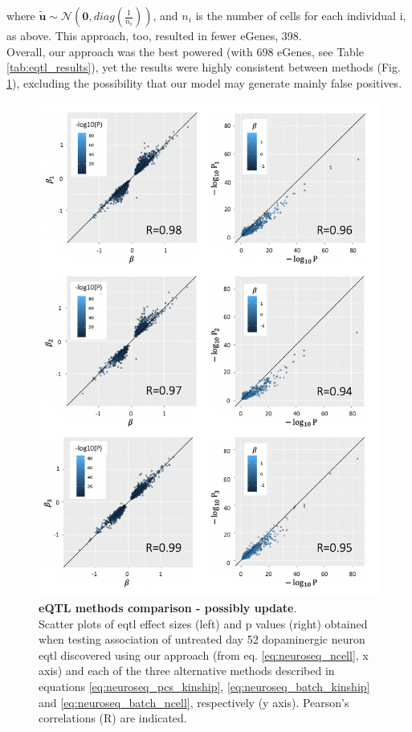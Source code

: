where $\tilde{\mathbf{u}} \sim \mathcal{N}(\mathbf{0}, diag(\frac{1}{n_i}))$, and $n_i$ is the number of cells for each individual i, as above.
This approach, too, resulted in fewer eGenes, 398.\\

Overall, our approach was the best powered (with 698 eGenes, see Table \ref{tab:eqtl_results}), yet the results were highly consistent between methods (Fig. \ref{fig:neuroseq_eqtl_methods_comp}), excluding the possibility that our model may generate mainly false positives.

\begin{figure}[htbp]
\centering
\includegraphics[width=13.5cm]{Chapter5/Fig/neuroseq_eqtl_methods_corr.png}
\caption[eQTL methods comparison]{\textbf{eQTL methods comparison - possibly update}.\\
Scatter plots of \gls{eqtl} effect sizes (left) and p values (right) obtained when testing association of untreated day 52 dopaminergic neuron \gls{eqtl} discovered using our approach (from eq. \eqref{eq:neuroseq_ncell}, x axis) and each of the three alternative methods described in equations \eqref{eq:neuroseq_pcs_kinship}, \eqref{eq:neuroseq_batch_kinship} and \eqref{eq:neuroseq_batch_ncell}, respectively (y axis). 
Pearson's correlations (R) are indicated.}
\label{fig:neuroseq_eqtl_methods_comp}
\end{figure}

